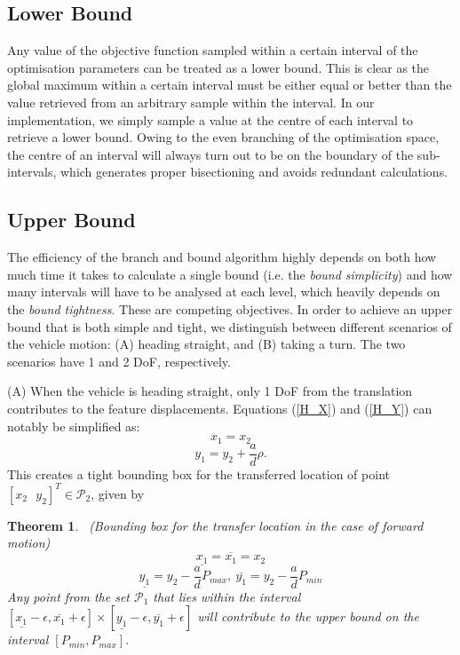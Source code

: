 \documentclass[letterpaper, 10 pt, conference]{ieeeconf}  %
\newtheorem{theorem}{Theorem}
\begin{document}
\subsection{Lower Bound}

Any value of the objective function sampled within a certain interval of the optimisation parameters can be treated as a lower bound. This is clear as the global maximum within a certain interval must be either equal or better than the value retrieved from an arbitrary sample within the interval. In our implementation, we simply sample a value at the centre of each interval to retrieve a lower bound. Owing to the even branching of the optimisation space, the centre of an interval will always turn out to be on the boundary of the sub-intervals, which generates proper bisectioning and avoids redundant calculations.

\subsection{Upper Bound}

The efficiency of the branch and bound algorithm highly depends on both how much time it takes to calculate a single bound (i.e. the \textit{bound simplicity}) and how many intervals will have to be analysed at each level, which heavily depends on the \textit{bound tightness}. These are competing objectives. In order to achieve an upper bound that is both simple and tight, we distinguish between different scenarios of the vehicle motion: (A) heading straight, and (B) taking a turn. The two scenarios have 1 and 2 DoF, respectively.

(A) When the vehicle is heading straight, only 1 DoF from the translation contributes to the feature displacements. Equations (\ref{H_X}) and (\ref{H_Y}) can notably be simplified as:
%
\begin{equation}
	\label{H_simplified_X}
	x_1 = x_2
\end{equation}
\begin{equation}
	\label{H_simplified_Y}
	y_1 = y_2  + \frac{a}{d} \rho.
\end{equation}
%
This creates a tight bounding box for the transferred location of point $[x_2 \text{ } y_2]^T \in \mathcal{P}_2$, given by 
%
\begin{theorem}\ 
\textit{(Bounding box for the transfer location in the case of forward motion)}
\begin{equation}
	\label{UB_Head_Straight_X}
	\underline{x_1} = \overline{x_1} = x_2
\end{equation}
\begin{equation}
	\label{UB_Head_Straight_Y}
	\underline{y_1} = y_2  - \frac{a}{d} P_{max},\  \overline{y_1} = y_2  - \frac{a}{d} P_{min}
\end{equation}
%
Any point from the set $\mathcal{P}_1$ that lies within the interval $[\underline{x_1}-\epsilon,\overline{x_1}+\epsilon] \times [\underline{y_1}-\epsilon,\overline{y_1}+\epsilon]$ will contribute to the upper bound on the interval $[P_{min},P_{max}]$.
\end{theorem}
\end{document}
